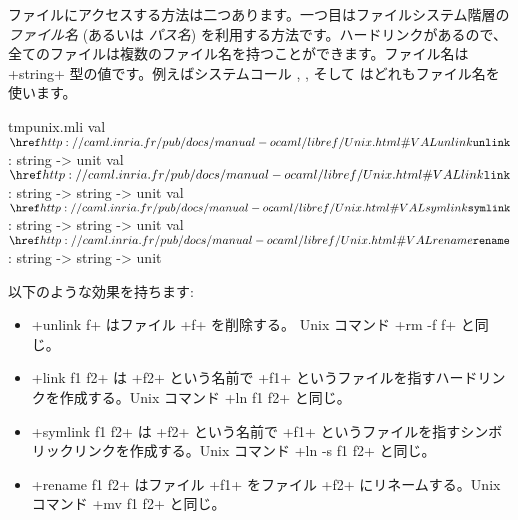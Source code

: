 ファイルにアクセスする方法は二つあります。一つ目はファイルシステム階層の \emph{ファイル名} (あるいは \emph{パス名}) を利用する方法です。ハードリンクがあるので、全てのファイルは複数のファイル名を持つことができます。ファイル名は \ml+string+ 型の値です。例えばシステムコール , ,  そして  はどれもファイル名を使います。
%
\begin{listingcodefile}{tmpunix.mli}
val $\libvalue{Unix}{unlink}$ : string -> unit
val $\libvalue{Unix}{link}$ : string -> string -> unit
val $\libvalue{Unix}{symlink}$ : string -> string -> unit
val $\libvalue{Unix}{rename}$ : string -> string -> unit
\end{listingcodefile}
%
以下のような効果を持ちます:
\begin{itemize}
\item \ml+unlink f+ はファイル \ml+f+ を削除する。 Unix コマンド \ml+rm -f f+ と同じ。
%
\item \ml+link f1 f2+ は \ml+f2+ という名前で \ml+f1+ というファイルを指すハードリンクを作成する。Unix コマンド \ml+ln f1 f2+ と同じ。
%
\item \ml+symlink f1 f2+ は \ml+f2+ という名前で \ml+f1+ というファイルを指すシンボリックリンクを作成する。Unix コマンド \ml+ln -s f1 f2+ と同じ。
%
\item \ml+rename f1 f2+ はファイル \ml+f1+ をファイル \ml+f2+ にリネームする。Unix コマンド \ml+mv f1 f2+ と同じ。
\end{itemize}

